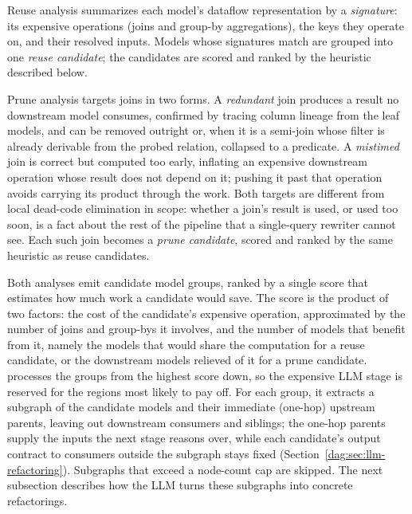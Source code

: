 Reuse analysis summarizes each model's dataflow representation by a \emph{signature}: its expensive operations (joins and group-by aggregations), the keys they operate on, and their resolved inputs. Models whose signatures match are grouped into one \emph{reuse candidate}; the candidates are scored and ranked by the heuristic described below.

Prune analysis targets joins in two forms. A \emph{redundant} join produces a result no downstream model consumes, confirmed by tracing column lineage from the leaf models, and can be removed outright or, when it is a semi-join whose filter is already derivable from the probed relation, collapsed to a predicate. A \emph{mistimed} join is correct but computed too early, inflating an expensive downstream operation whose result does not depend on it; pushing it past that operation avoids carrying its product through the work. Both targets are different from local dead-code elimination in scope: whether a join's result is used, or used too soon, is a fact about the rest of the pipeline that a single-query rewriter cannot see. Each such join becomes a \emph{prune candidate}, scored and ranked by the same heuristic as reuse candidates.

Both analyses emit candidate model groups, ranked by a single score that estimates how much work a candidate would save. The score is the product of two factors: the cost of the candidate's expensive operation, approximated by the number of joins and group-bys it involves, and the number of models that benefit from it, namely the models that would share the computation for a reuse candidate, or the downstream models relieved of it for a prune candidate. \dagsmith{} processes the groups from the highest score down, so the expensive LLM stage is reserved for the regions most likely to pay off. For each group, it extracts a subgraph of the candidate models and their immediate (one-hop) upstream parents, leaving out downstream consumers and siblings; the one-hop parents supply the inputs the next stage reasons over, while each candidate's output contract to consumers outside the subgraph stays fixed (Section~\ref{dag:sec:llm-refactoring}). Subgraphs that exceed a node-count cap are skipped. The next subsection describes how the LLM turns these subgraphs into concrete refactorings.



